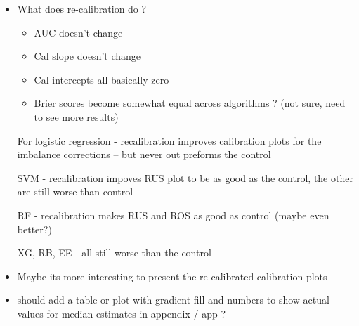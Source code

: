\documentclass[AMA,STIX1COL,]{WileyNJD-v2}
\providecommand{\tightlist}{%
  \setlength{\itemsep}{0pt}\setlength{\parskip}{0pt}}
\begin{document}
\begin{itemize}
  EXTREME IMBALANCE (EF = 0.02)

  \begin{itemize}
  \item
    control scenario -- if I had to pick a winner its logistic
    regression, but lr svm, rf, and xg follow the same pattern, start
    out fine, and then when it comes to predicted risks above 0.25, the
    calibration is very sporadic. calibration in these algorithms is
    somewhat unpredictable. Conversly, rb and ee have very predictable
    behaviour -- consistently over-estimating risk.
  \item
    all imbalance corrections -- nothing is helping improve
    calibration.\\
  \item
    rus predictable pattern across algorithms -- over estimating risk
  \item
    svm and xg boost similar pattern for ros, smote, senn -- what is
    going on here.
  \item
    again, as an exception, rf appears to do well with ROS.
  \end{itemize}
\item
  What does re-calibration do ?

  \begin{itemize}
  \tightlist
  \item
    AUC doesn't change
  \item
    Cal slope doesn't change
  \item
    Cal intercepts all basically zero
  \item
    Brier scores become somewhat equal across algorithms ? (not sure,
    need to see more results)
  \end{itemize}

  For logistic regression - recalibration improves calibration plots for
  the imbalance corrections -- but never out preforms the control

  SVM - recalibration impoves RUS plot to be as good as the control, the
  other are still worse than control

  RF - recalibration makes RUS and ROS as good as control (maybe even
  better?)

  XG, RB, EE - all still worse than the control
\item
  Maybe its more interesting to present the re-calibrated calibration
  plots
\item
  should add a table or plot with gradient fill and numbers to show
  actual values for median estimates in appendix / app ?
\end{itemize}
\end{document}
